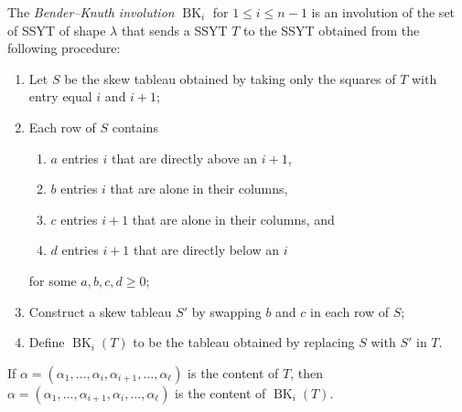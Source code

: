 \documentclass[ALCO,Unicode]{cedram}
\newcommand{\BK}{\operatorname{BK}}
\begin{document}
    \begin{defi}\label{defn:BK_CST}
    The {\it Bender--Knuth involution} $\BK_i$ for $1 \le i \le n-1$ is an involution of the set of SSYT of shape $\lambda$ that sends a SSYT $T$ to the SSYT obtained from the following procedure:
    
    \begin{enumerate}
        \item Let $S$ be the skew tableau obtained by taking only the squares of $T$ with entry equal $i$ and $i+1$;
        \item Each row of $S$ contains
            \begin{enumerate}
                \item $a$ entries $i$ that are directly above an $i+1$,
                \item $b$ entries $i$ that are alone in their columns,
                \item $c$ entries $i+1$ that are alone in their columns, and
                \item $d$ entries $i+1$ that are directly below an $i$
            \end{enumerate}
        for some $a,b,c,d \geq 0$;
        \item Construct a skew tableau $S'$ by swapping $b$ and $c$ in each row of $S$;
        \item Define $\BK_i(T)$ to be the tableau obtained by replacing $S$ with $S'$ in $T$.
    \end{enumerate}
    If $\alpha = (\alpha_1,\ldots,\alpha_i,\alpha_{i+1},\ldots,\alpha_\ell)$ is the content of $T$, then $\alpha = (\alpha_1,\ldots,\alpha_{i+1},\alpha_i,\ldots,\alpha_\ell)$ is the content of $\BK_i(T)$.
    
    \end{defi}
    
\end{document}
